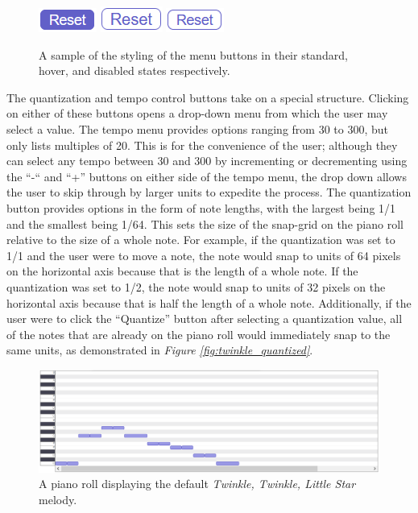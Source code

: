 \begin{figure}[h!]
  \centering
  \includegraphics{image/StdUI.png}
  \includegraphics{image/HoverUI.png}
  \includegraphics{image/DisabledUI.png}
  \caption{A sample of the styling of the menu buttons in their standard, hover, and disabled states respectively.}
  \label{fig:ui_variations}
\end{figure}

The quantization and tempo control buttons take on a special structure. Clicking on either of
these buttons opens a drop-down menu from which the user may select a value. The tempo menu
provides options ranging from 30 to 300, but only lists multiples of 20. This is for the
convenience of the user; although they can select any tempo between 30 and 300 by incrementing or
decrementing using the “-“ and “+” buttons on either side of the tempo menu, the drop down allows
the user to skip through by larger units to expedite the process. The quantization button provides
options in the form of note lengths, with the largest being 1/1 and the smallest being 1/64. This
sets the size of the snap-grid on the piano roll relative to the size of a whole note. For example,
if the quantization was set to 1/1 and the user were to move a note, the note would snap to units
of 64 pixels on the horizontal axis because that is the length of a whole note. If the quantization
was set to 1/2, the note would snap to units of 32 pixels on the horizontal axis because that is
half the length of a whole note. Additionally, if the user were to click the “Quantize” button
after selecting a quantization value, all of the notes that are already on the piano roll would
immediately snap to the same units, as demonstrated in \textit{Figure \ref{fig:twinkle_quantized}}.

\begin{figure}[h!]
  \centering
  \includegraphics[width=\linewidth]{image/TwinkleOriginal.png}
  \caption{A piano roll displaying the default \textit{Twinkle, Twinkle, Little Star} melody.}
  \label{fig:twinkle_original}
\end{figure}

